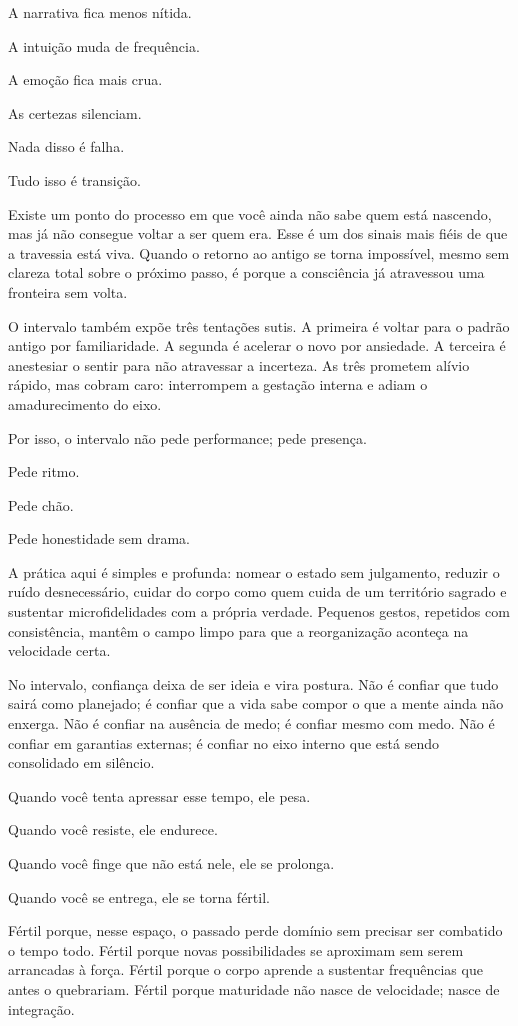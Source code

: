 \documentclass[12pt]{book}
\begin{document}
A narrativa fica menos nítida.

A intuição muda de frequência.

A emoção fica mais crua.

As certezas silenciam.

Nada disso é falha.

Tudo isso é transição.

Existe um ponto do processo em que você ainda não sabe quem está nascendo, mas já não consegue voltar a ser quem era. Esse é um dos sinais mais fiéis de que a travessia está viva. Quando o retorno ao antigo se torna impossível, mesmo sem clareza total sobre o próximo passo, é porque a consciência já atravessou uma fronteira sem volta.

O intervalo também expõe três tentações sutis. A primeira é voltar para o padrão antigo por familiaridade. A segunda é acelerar o novo por ansiedade. A terceira é anestesiar o sentir para não atravessar a incerteza. As três prometem alívio rápido, mas cobram caro: interrompem a gestação interna e adiam o amadurecimento do eixo.

Por isso, o intervalo não pede performance; pede presença.

Pede ritmo.

Pede chão.

Pede honestidade sem drama.

A prática aqui é simples e profunda: nomear o estado sem julgamento, reduzir o ruído desnecessário, cuidar do corpo como quem cuida de um território sagrado e sustentar microfidelidades com a própria verdade. Pequenos gestos, repetidos com consistência, mantêm o campo limpo para que a reorganização aconteça na velocidade certa.

No intervalo, confiança deixa de ser ideia e vira postura. Não é confiar que tudo sairá como planejado; é confiar que a vida sabe compor o que a mente ainda não enxerga. Não é confiar na ausência de medo; é confiar mesmo com medo. Não é confiar em garantias externas; é confiar no eixo interno que está sendo consolidado em silêncio.

Quando você tenta apressar esse tempo, ele pesa.

Quando você resiste, ele endurece.

Quando você finge que não está nele, ele se prolonga.

Quando você se entrega, ele se torna fértil.

Fértil porque, nesse espaço, o passado perde domínio sem precisar ser combatido o tempo todo. Fértil porque novas possibilidades se aproximam sem serem arrancadas à força. Fértil porque o corpo aprende a sustentar frequências que antes o quebrariam. Fértil porque maturidade não nasce de velocidade; nasce de integração.
\end{document}
